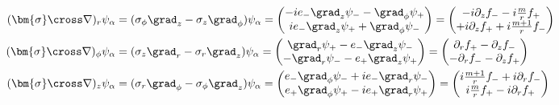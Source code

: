 \documentclass[a4paper,11pt,titlepage,uplatex]{jsarticle}
\begin{document}
\begin{align}
  (\bm{\sigma}\cross\nabla)_r\psi_{\alpha} &=
  (\sigma_{\phi}\grad_{z} - \sigma_{z}\grad_{\phi})\psi_\alpha 
  = 
  \begin{pmatrix}
  -ie_-\grad_{z}  \psi_{-} - \grad_{\phi}\psi_{+} \\
  ie_-\grad_{z}\psi_{+} + \grad_{\phi}\psi_{-}
  \end{pmatrix}
  =
  \begin{pmatrix}
    -i\partial_{z}f_{-} - i\frac{m}{r}f_{+} \\
    +i\partial_{z}f_{+}  + i\frac{m+1}{r}f_{-}
  \end{pmatrix} \\
  (\bm{\sigma}\cross\nabla)_\phi\psi_{\alpha} &=
  (\sigma_{z}\grad_{r} - \sigma_{r}\grad_{z})\psi_\alpha 
  = 
  \begin{pmatrix}
   \grad_{r}\psi_{+} - e_{-}\grad_{z}\psi_{-} \\
  -\grad_{r}\psi_{-} - e_{+}\grad_{z}\psi_{+}
  \end{pmatrix}
  =
  \begin{pmatrix}
    \partial_{r}f_{+} - \partial_{z}f_{-} \\
   -\partial_{r}f_{-} - \partial_{z}f_{+}
  \end{pmatrix} \\ 
  (\bm{\sigma}\cross\nabla)_z\psi_{\alpha} &=
  (\sigma_{r}\grad_{\phi} - \sigma_{\phi}\grad_{z})\psi_\alpha 
  = 
  \begin{pmatrix}
   e_{-}\grad_{\phi}\psi_{-} + ie_{-}\grad_{r}\psi_{-} \\
   e_{+}\grad_{\phi}\psi_{+} - ie_{+}\grad_{r}\psi_{+}
  \end{pmatrix}
  =
  \begin{pmatrix}
   i\frac{m+1}{r}f_{-} + i\partial_{r}f_{-} \\
   i\frac{m}{r}  f_{+} - i\partial_{r}f_{+}
  \end{pmatrix}
\end{align}
\end{document}
